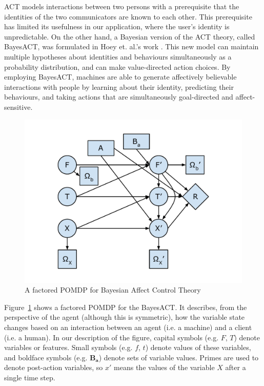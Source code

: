 ACT models interactions between two persons with a prerequisite that the identities of the two communicators are known to each other. This prerequisite has limited its usefulness in our application, where the user's identity is unpredictable. On the other hand, a Bayesian version of the ACT theory, called BayesACT, was formulated in Hoey et. al.'s work \cite{hoey2013bayesian}. This new model can maintain multiple hypotheses about identities and behaviours simultaneously as a probability distribution, and can make value-directed action choices. By employing BayesACT, machines are able to generate affectively believable interactions with people by learning about their identity, predicting their behaviours, and taking actions that are simultaneously goal-directed and affect-sensitive.

\begin{figure}[htb]
\centering
\includegraphics[trim = 10mm 10mm 10mm 10mm, clip, width=0.7\linewidth]{fig/fig-bayesact.pdf}
\caption{A factored POMDP for Bayesian Affect Control Theory}
\label{fig:bayesact}
\end{figure}

Figure~\ref{fig:bayesact} shows a factored POMDP for the BayesACT. It describes, from the perspective of the agent (although this is symmetric), how the variable state changes based on an interaction between an agent (i.e. a machine) and a client (i.e. a human). In our description of the figure, capital symbols (e.g. $F$, $T$) denote variables or features. Small symbols (e.g. $f$, $t$) denote values of these variables, and boldface symbols (e.g. $\mathbf{B_{a}}$) denote sets of variable values. Primes are used to denote post-action variables, so $x'$ means the values of the variable $X$ after a single time step.

